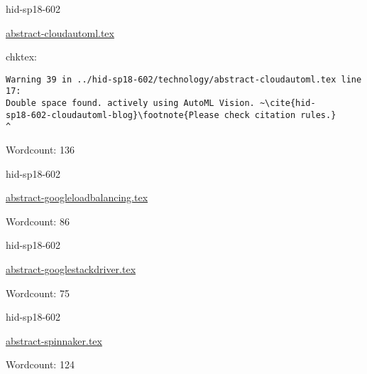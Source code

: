 

\begin{IU}

hid-sp18-602

\href{https://github.com/cloudmesh-community/hid-sp18-602/blob/master//technology/abstract-cloudautoml.tex}{abstract-cloudautoml.tex}

 
chktex:
\begin{tiny}
\begin{verbatim}
Warning 39 in ../hid-sp18-602/technology/abstract-cloudautoml.tex line 17:
Double space found. actively using AutoML Vision. ~\cite{hid-
sp18-602-cloudautoml-blog}\footnote{Please check citation rules.}
^
\end{verbatim}
\end{tiny}

Wordcount: 136

\end{IU}



\begin{IU}

hid-sp18-602

\href{https://github.com/cloudmesh-community/hid-sp18-602/blob/master//technology/abstract-googleloadbalancing.tex}{abstract-googleloadbalancing.tex}

 

Wordcount: 86

\end{IU}



\begin{IU}

hid-sp18-602

\href{https://github.com/cloudmesh-community/hid-sp18-602/blob/master//technology/abstract-googlestackdriver.tex}{abstract-googlestackdriver.tex}

 

Wordcount: 75

\end{IU}



\begin{IU}

hid-sp18-602

\href{https://github.com/cloudmesh-community/hid-sp18-602/blob/master//technology/abstract-spinnaker.tex}{abstract-spinnaker.tex}

 

Wordcount: 124

\end{IU}

